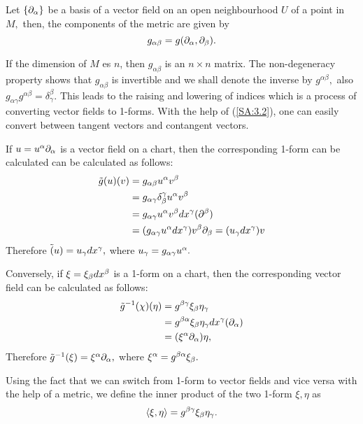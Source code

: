 Let $\left\{ \partial_{\alpha} \right\}$ be a basis of a vector field on an open neighbourhood $U$ of a point in $M,$ then, the
components of the metric are given by
\begin{equation}
\label{SA:3.3}
g_{\alpha \beta}=g(\partial_{\alpha}, \partial_{\beta}).
\end{equation}

If the dimension of $M $ es $n$, then $g_{\alpha \beta}$ is an $n \times n$ matrix. The non-degeneracy property shows
that $g_{\alpha \beta}$ is invertible and we shall denote the inverse by $g^{\alpha \beta},$ also $g_{\alpha
\gamma}g^{\alpha \beta}=\delta_{\gamma}^{\beta}.$ This leads to the raising and lowering of indices which is a process
of converting vector fields to 1-forms. With the help of (\ref{SA:3.2}), one can easily convert between tangent vectors
and contangent vectors.

\begin{exmp}
\label{SA:3.1.2}
If $u=u^{\alpha}\partial_{\alpha}$ is a vector field on a chart, then the corresponding 1-form can be calculated can be
calculated as follows:
\begin{align*}
 \tilde{g}(u)(v)&=g_{\alpha \beta}u^{\alpha}v^{\beta} \\
&=g_{\alpha \gamma}\delta^{\gamma}_{\beta}u^{\alpha}v^{\beta} \\
&=g_{\alpha \gamma}u^{\alpha}v^{\beta}dx^{\gamma}(\partial^{\beta})\\
&=(g_{\alpha \gamma}u^{\alpha}dx^{\gamma})v^{\beta}\partial_{\beta}= (u_{\gamma}dx^{\gamma})v
\end{align*}
Therefore $\tilde(u)=u_{\gamma}dx^{\gamma},$ where $u_{\gamma}=g_{\alpha \gamma}u^{\alpha}.$

Conversely, if $\xi=\xi_{\beta}dx^{\beta}$ is a 1-form on a chart, then the corresponding vector field can be calculated
as follows:
\begin{align*}
 \tilde{g}^{-1}(\chi)(\eta)&=g^{\beta \gamma}\xi_{\beta}\eta_{\gamma}\\
&=g^{\beta \alpha}\xi_{\beta}\eta_{\gamma}dx^{\gamma}(\partial_{\alpha})\\
&= (\xi^{\alpha}\partial_{\alpha})\eta,
\end{align*}
Therefore $\tilde{g}^{-1}(\xi)=\xi^{\alpha}\partial_{\alpha},$ where $\xi^{\alpha}=g^{\beta \alpha}\xi_{\beta}.$
\end{exmp}

Using the fact that we can switch from 1-form to vector fields and vice versa with the help of a metric, we define the
inner product of the two 1-form $\xi, \eta$ as
\begin{equation}
 \label{SA:3.4}
\langle \xi, \eta \rangle = g^{\beta \gamma} \xi_{\beta} \eta_{\gamma}.
\end{equation}

